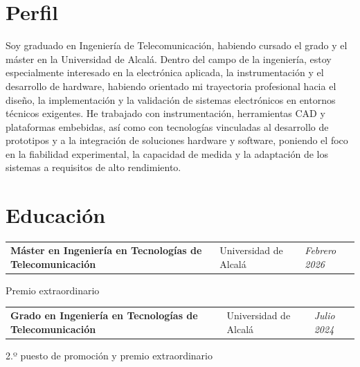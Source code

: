 \section{Perfil}
\begin{onecolentry}
	Soy graduado en Ingeniería de Telecomunicación, habiendo cursado el grado y el máster en la Universidad de Alcalá. Dentro del campo de la ingeniería, estoy especialmente interesado en la electrónica aplicada, la instrumentación y el desarrollo de hardware, habiendo orientado mi trayectoria profesional hacia el diseño, la implementación y la validación de sistemas electrónicos en entornos técnicos exigentes. He trabajado con instrumentación, herramientas CAD y plataformas embebidas, así como con tecnologías vinculadas al desarrollo de prototipos y a la integración de soluciones hardware y software, poniendo el foco en la fiabilidad experimental, la capacidad de medida y la adaptación de los sistemas a requisitos de alto rendimiento.
\end{onecolentry}

\vspace{-5pt}

\section{Educación}

\begin{onecolentry}
	\begin{tabularx}{\textwidth}{@{}>{\raggedright\arraybackslash}X>{\raggedright\arraybackslash}p{3.6cm}>{\raggedleft\arraybackslash}p{2.4cm}@{}}
		\textbf{Máster en Ingeniería en Tecnologías de Telecomunicación} & Universidad de Alcalá & \textit{Febrero 2026}
	\end{tabularx}
	
	\vspace{0.05 cm}
	\hspace{0.2cm}Premio extraordinario
\end{onecolentry}

\vspace{0.2 cm}

\begin{onecolentry}
	\begin{tabularx}{\textwidth}{@{}>{\raggedright\arraybackslash}X>{\raggedright\arraybackslash}p{3.6cm}>{\raggedleft\arraybackslash}p{2.4cm}@{}}
		\textbf{Grado en Ingeniería en Tecnologías de Telecomunicación} & Universidad de Alcalá & \textit{Julio 2024}
	\end{tabularx}
	
	\vspace{0.05 cm}
	\hspace{0.2cm}2.º puesto de promoción y premio extraordinario
\end{onecolentry}


